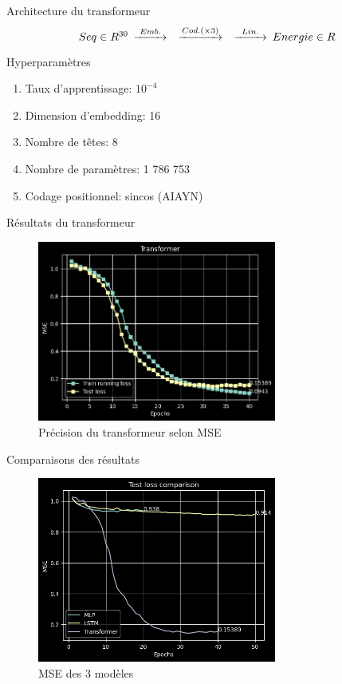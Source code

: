 \documentclass{beamer}
\begin{document}
\begin{frame}{Architecture du transformeur}
\begin{equation*}
    \begin{CD}
        @. Seq \in R^{30}
        @>Emb.>> 
        @>Cod. (\times 3)>> 
        @>Lin.>> Energie \in R
    \end{CD}
\end{equation*}

\begin{block}{Hyperparamètres}
\begin{enumerate}
    \item Taux d'apprentissage: $10^{-4}$
    \item Dimension d'embedding: 16
    \item Nombre de têtes: 8
    \item Nombre de paramètres: 1 786 753 
    \item Codage positionnel: sincos (AIAYN)
\end{enumerate}
\end{block}
\end{frame}


\begin{frame}{Résultats du transformeur}
\begin{figure} \label{fig:transformer_accuracy}
    \caption{Précision du transformeur selon MSE} \center
    \includegraphics[width=0.7\textwidth]{images/2023-04-02-13-48-49.png}
\end{figure}
\end{frame}
\begin{frame}{Comparaisons des résultats}
\begin{figure}
    \caption{MSE des 3 modèles} \center
    \includegraphics[width=0.7\textwidth]{images/comparaison.png}
\end{figure}
\end{frame}
\end{document}
